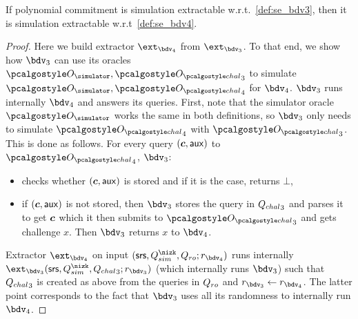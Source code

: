 \documentclass[runningheads,11pt]{llncs}
\let\spvec\vec
\let\vec\accentvec
\let\spvec\vec
\let\vec\spvec
\def\vec#1{\mathchoice{\mbox{\boldmath$\displaystyle#1$}}
  {\mbox{\boldmath$\textstyle#1$}} {\mbox{\boldmath$\scriptstyle#1$}}
  {\mbox{\boldmath$\scriptscriptstyle#1$}}}
\begin{document}
\begin{lemma}[]
  If polynomial commitment is simulation extractable w.r.t.~\cref{def:se_bdv3}, then
  it is simulation extractable w.r.t~\cref{def:se_bdv4}.
\end{lemma}
\begin{proof}
  Here we build extractor $\ext_{\bdv_4}$ from $\ext_{\bdv_3}$. To that end, we show
  how $\bdv_3$ can use its oracles $\oracles, \oraclec_3$ to simulate
  $\oracles, \oraclec_4$ for $\bdv_4$. $\bdv_3$ runs internally $\bdv_4$ and answers
  its queries. First, note that the simulator oracle $\oracles$ works the same in
  both definitions, so $\bdv_3$ only needs to simulate $\oraclec_4$ with
  $\oraclec_3$. This is done as follows. For every query $(\vec{c}, \aux)$ to
  $\oraclec_4$, $\bdv_3$:
  \begin{itemize}
  \item checks whether $(\vec{c}, \aux)$ is stored and if it is the case, returns
    $\bot$,
  \item if $(\vec{c}, \aux)$ is not stored, then $\bdv_3$ stores the query in
    ${Q_{chal}}_3$ and parses it to get $\vec{c}$ which it then submits to $\oraclec_3$
    and gets challenge $x$. Then $\bdv_3$ returns $x$ to $\bdv_4$.
  \end{itemize}

  Extractor $\ext_{\bdv_4}$ on input $(\srs, \Qsim, \Qh; r_{\bdv_4})$ runs internally
  $\ext_{\bdv_3} (\srs, \Qsim, \Qchal_3; r_{\bdv_3})$ (which internally runs
  $\bdv_3$) such that ${Q_{chal}}_3$ is created as above from the queries in $Q_{ro}$ and
  $r_{\bdv_3} \gets r_{\bdv_4}$. The latter point corresponds to the fact that
  $\bdv_3$ uses all its randomness to internally run $\bdv_4$.
\end{proof}
\end{document}
